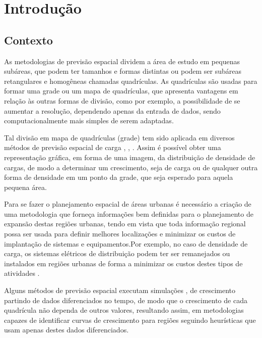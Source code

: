 \chapter{Introdução}
\label{introducao}

\section{Contexto}

As metodologias de previsão espacial dividem a área de estudo em pequenas subáreas, que podem ter tamanhos e formas distintas ou podem ser subáreas retangulares e homogêneas chamadas quadrículas. As quadrículas são usadas para formar uma grade ou um mapa de quadrículas, que  apresenta vantagens em relação às outras formas de divisão, como por exemplo, a possibilidade de se aumentar a resolução, dependendo apenas da entrada de dados, sendo computacionalmente mais simples de serem adaptadas.

Tal  divisão em mapa de quadrículas (grade) tem sido aplicada em diversos métodos de previsão espacial de carga \cite{willis2002spatial}, \cite{melo2012multi}, \cite{arango2004spatial}. Assim é possível obter uma representação gráfica, em forma de uma imagem, da distribuição de densidade de cargas, de modo a determinar um crescimento, seja de carga ou de qualquer outra forma de densidade em um ponto da grade, que seja esperado para aquela pequena área. 

Para se fazer o planejamento espacial de áreas urbanas é necessário a criação de uma metodologia que forneça informações bem definidas para o planejamento de expansão destas regiões urbanas, tendo em vista que toda informação regional possa ser usada para definir melhores localizações e minimizar os custos de implantação de sistemas e equipamentos.Por exemplo, no caso de densidade de carga, os sistemas elétricos de distribuição podem ter ser remanejados ou instalados em regiões urbanas de forma a minimizar os custos destes tipos de atividades \cite{willis2007spatial}.    

Alguns métodos de previsão espacial executam simulações \cite{arango2004spatial}, \cite{carreno2011cellular} de crescimento partindo de dados diferenciados no tempo, de modo que o crescimento de cada quadrícula não dependa de outros valores, resultando assim, em metodologias capazes de identificar curvas de crescimento para regiões seguindo heurísticas que usam apenas destes dados diferenciados. 

